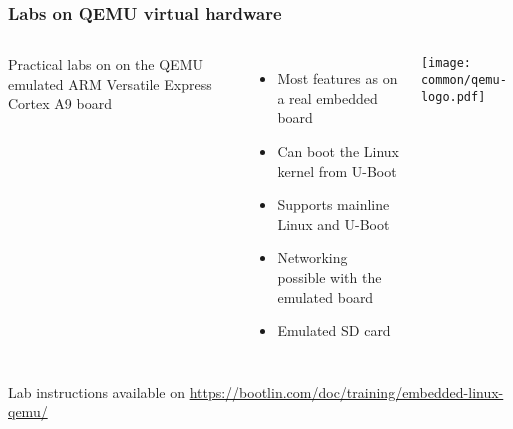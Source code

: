 \begin{frame}
\frametitle{Labs on QEMU virtual hardware}
  \begin{columns}
    Practical labs on on the QEMU emulated
    ARM Versatile Express Cortex A9 board
    \begin{itemize}
    \item Most features as on a real embedded board
    \item Can boot the Linux kernel from U-Boot
    \item Supports mainline Linux and U-Boot
    \item Networking possible with the emulated board
    \item Emulated SD card
    \end{itemize}
    \texttt{[image: common/qemu-logo.pdf]}
  \end{columns}
  \vspace{1cm}
  Lab instructions available on
  \url{https://bootlin.com/doc/training/embedded-linux-qemu/}
\end{frame}
